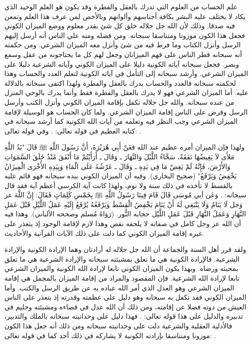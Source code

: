 علم الحساب من العلوم التي تدرك بالعقل والفطرة وقد يكون هو العلم الوحيد الذي يكاد لا يختلف عليه البشر بكافة أجناسهم وألوانهم وبالأخص لمن عرف هذا العلم وتمعن فيه صدقا. وذلك لأن الله جل جلاله خلق كل شئ بقدر معلوم ووضع الميزان الكوني فجعل هذا الكون موزونا ومتناسقا سبحانه. ومن فضله ومنه علي الناس أنه أرسل إليهم الرسل وأنزل الكتاب وما فرط فيه من شئ وأنزل معه الميزان الشرعي. ومن حكمته أنه سبحانه فطر الناس على فهم الميزانان وجعل لهم كل ما يحتاجونه من عقل وسمع وبصر. فجعل سبحانه آياته الكونية دليلا على الميزان الكوني وآياته الشرعية دليلا على الميزان الشرعي. وأرشد سبحانه إلى التأمل في آياته الكونية لتعلم العدد والحساب وهذا لحكمته سبحانه فالعدد والحساب يدرك بالعقل والفطرة ولهذا اكتفى سبحانه بالدلالة عليه. أما الميزان الشرعي فهو لا يدرك بالعقل والفطرة فقط وأنما يدرك بالوحي المنزل من عنده سبحانه. والله جل جلاله تكفل بإقامة الميزان الكوني وأنزل الكتب وأرسل الرسل وفرض على الناس إقامة الميزان الشرعي. ولما كان الحساب هو الوسيلة لإقامة الميزان الشرعي وجب النظر فيه وتعلمه من آيات الله الكونية كما أرشد سبحانه في  كتابه العظيم في قوله تعالى: \quranayah*[10][5]{\footnotesize \surahname*[10]}. وفي قوله تعالى:
\quranayah*[17][12]{\footnotesize \surahname*[17]}.

ولهذا فإن الميزان أمره عظيم عند الله فعَنْ أَبِي هُرَيْرَةَ، أَنَّ رَسُولَ اللَّهِ ﷺ قَالَ "يَدُ اللَّهِ مَلأَى لاَ يَغِيضُهَا نَفَقَةٌ، سَحَّاءُ اللَّيْلَ وَالنَّهَارَ ـ وَقَالَ ـ أَرَأَيْتُمْ مَا أَنْفَقَ مُنْذُ خَلَقَ السَّمَوَاتِ وَالأَرْضَ، فَإِنَّهُ لَمْ يَغِضْ مَا فِي يَدِهِ ـ وَقَالَ ـ عَرْشُهُ عَلَى الْمَاءِ وَبِيَدِهِ الأُخْرَى الْمِيزَانُ يَخْفِضُ وَيَرْفَعُ" {\footnotesize (صحيح البخاري)}. وفيه أن الميزان الكوني بيده سبحانه فهو قائم عليه بالقسط لا تأخذه في ذلك سنة ولا نوم، ولهذا كانت آية الكرسي أعظم آية فقد قال سبحانه:
\quranayah*[2][255][1-12]{\footnotesize \surahname*[2]}. وَعَن أبي مُوسَى قَالَ قَامَ فِينَا رَسُولُ اللَّهِ ﷺ بِخَمْسِ كَلِمَاتٍ فَقَالَ: إِنَّ اللَّهَ عز وَجل لَا يَنَامُ وَلَا يَنْبَغِي لَهُ أَنْ يَنَامَ يَخْفِضُ الْقِسْطَ وَيَرْفَعُهُ يُرْفَعُ إِلَيْهِ عَمَلُ اللَّيْلِ قَبْلَ عَمَلِ النَّهَارِ وَعَمَلُ النَّهَارِ قَبْلَ عَمَلِ اللَّيْل حجابه النُّور. {\footnotesize (رَوَاهُ مُسلم وصححه الألباني)}. وهذا فيه أن الله عز وجل كامل في صفاته لا يلحقه نقص وهذا لازم لإقامة الوجود إذ يتعذر على غيره إقامة الميزان الكوني كما دلت على ذلك الآيات القرآنية والأحاديث.

ولقد قرر أهل السنة والجماعة أن الله جل جلاله له أرادتان وهما الإرادة الكونية والإرادة الشرعية. فالإرادة الكونية هي ما تعلق بمشيئته سبحانه والإرادة الشرعية هي ما تعلق بمحبته ورضاه. وبهذا يكون الميزان الكوني تابعا لإرادة الله الكونية والميزان الشرعي تابعا لإرادة الله الشرعية. فإن المقصود والمراد من إقامة الميزان بالمجمل هي إقامة الميزان الشرعي وهو العدل الذي أمر الله عباده به عن طريق الرسل والكتب. وأما الميزان الكوني فقد تكفل به سبحانه وهو دليل على عظمته وقدرته إذ يتعذر على الناس العيش من دونه فضلا عن إقامته، ومن ذلك أن الله عدل في قضاءه ومشيئته وحليم في تدبيره والدليل على هذا قوله تعالى:
\quranayah*[35][41]{\footnotesize \surahname*[35]}. فهذا دليل على وحدانيته سبحانه بالملك والتدبير، فالأدلية العقلية والشرعية دلت على وحدانيته سبحانه ومن ذلك أنه جعل هذا الكون موزونا ومتناسقا بإرادته الكونية لا يشاركه في ذلك أحد كما في قوله تعالى:
\quranayah*[21][22]{\footnotesize \surahname*[21]}.


